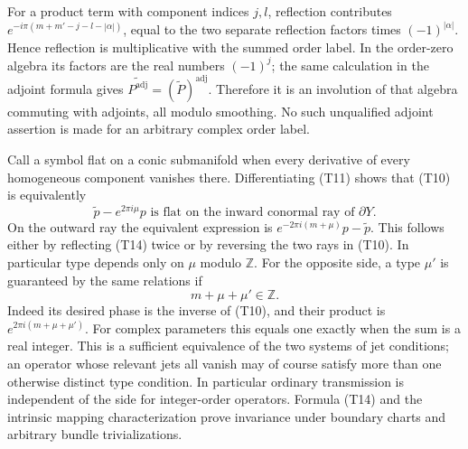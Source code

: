 \documentclass[
  11pt,
]{article}
\makeatletter
\let\ReaderOriginalAnchorStart\hyper@anchorstart
\let\ReaderOriginalAnchorEnd\hyper@anchorend
\let\ReaderPendingAliases\@empty
\def\ReaderArmAliases#1{\gdef\ReaderPendingAliases{#1}}
\def\hyper@anchorstart#1{\ReaderIfNativeAnchorTF{#1}{\ReaderPendingAliases\global\let\ReaderPendingAliases\@empty}{}\ReaderOriginalAnchorStart{#1}}
\makeatother
\begin{document}
For a product term with component indices \(j,l\), reflection
contributes \(e^{-i\pi(m+m'-j-l-|\alpha|)}\), equal to the two separate
reflection factors times \((-1)^{|\alpha|}\). Hence reflection is
multiplicative with the summed order label. In the order-zero algebra
its factors are the real numbers \((-1)^j\); the same calculation in the
adjoint formula gives
\(\widetilde{P^{\mathrm{adj}}}=(\widetilde P)^{\mathrm{adj}}\).
Therefore it is an involution of that algebra commuting with adjoints,
all modulo smoothing. No such unqualified adjoint assertion is made for
an arbitrary complex order label.

Call a symbol flat on a conic submanifold when every derivative of every
homogeneous component vanishes there. Differentiating (T11) shows that
(T10) is equivalently \[
\widetilde p-e^{2\pi i\mu}p
\text{ is flat on the inward conormal ray of }\partial Y.
\tag{T14}
\] On the outward ray the equivalent expression is
\(e^{-2\pi i(m+\mu)}p-\widetilde p\). This follows either by reflecting
(T14) twice or by reversing the two rays in (T10). In particular type
depends only on \(\mu\) modulo \(\mathbb Z\). For the opposite side, a
type \(\mu'\) is guaranteed by the same relations if \[
m+\mu+\mu'\in\mathbb Z.
\tag{T15}
\] Indeed its desired phase is the inverse of (T10), and their product
is \(e^{2\pi i(m+\mu+\mu')}\). For complex parameters this equals one
exactly when the sum is a real integer. This is a sufficient equivalence
of the two systems of jet conditions; an operator whose relevant jets
all vanish may of course satisfy more than one otherwise distinct type
condition. In particular ordinary transmission is independent of the
side for integer-order operators. Formula (T14) and the intrinsic
mapping characterization prove invariance under boundary charts and
arbitrary bundle trivializations.

\ReaderArmAliases{\ReaderOriginalAnchorStart{AN03-TR-005}\ReaderOriginalAnchorEnd\begingroup\expandafter\def\csname @currentHref\endcsname{AN03-TR-005}\label{AN03-TR-005}\endgroup\ReaderOriginalAnchorStart{an03-tr-005-a-normal-integral-defined-by-analytic-subtraction}\ReaderOriginalAnchorEnd\begingroup\expandafter\def\csname @currentHref\endcsname{an03-tr-005-a-normal-integral-defined-by-analytic-subtraction}\label{an03-tr-005-a-normal-integral-defined-by-analytic-subtraction}\endgroup\ReaderOriginalAnchorStart{12-a-normal-integral-defined-by-analytic-subtraction}\ReaderOriginalAnchorEnd\begingroup\expandafter\def\csname @currentHref\endcsname{12-a-normal-integral-defined-by-analytic-subtraction}\label{12-a-normal-integral-defined-by-analytic-subtraction}\endgroup\ReaderOriginalAnchorStart{a-normal-integral-defined-by-analytic-subtraction}\ReaderOriginalAnchorEnd}
\end{document}
